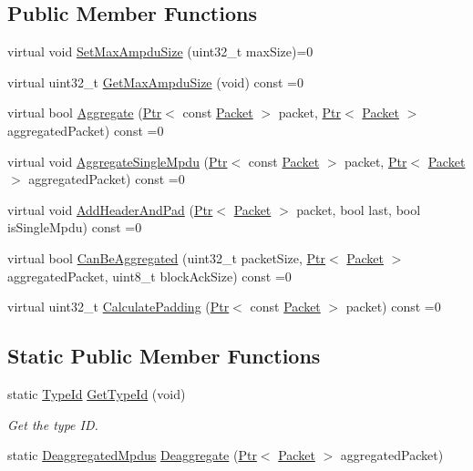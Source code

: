 \subsection*{Public Member Functions}
\begin{DoxyCompactItemize}
\item 
virtual void \hyperlink{classns3_1_1MpduAggregator_a00344d9ef60b8ad4368769b31761f55d}{Set\+Max\+Ampdu\+Size} (uint32\+\_\+t max\+Size)=0
\item 
virtual uint32\+\_\+t \hyperlink{classns3_1_1MpduAggregator_a781ed153a388bbc8a5ac231cfd9218c8}{Get\+Max\+Ampdu\+Size} (void) const =0
\item 
virtual bool \hyperlink{classns3_1_1MpduAggregator_a8452ad0dca5d5a0fef52991c4f4cf610}{Aggregate} (\hyperlink{classns3_1_1Ptr}{Ptr}$<$ const \hyperlink{classns3_1_1Packet}{Packet} $>$ packet, \hyperlink{classns3_1_1Ptr}{Ptr}$<$ \hyperlink{classns3_1_1Packet}{Packet} $>$ aggregated\+Packet) const =0
\item 
virtual void \hyperlink{classns3_1_1MpduAggregator_a41a0e95112386fd7b7e33c1c12dc6bb0}{Aggregate\+Single\+Mpdu} (\hyperlink{classns3_1_1Ptr}{Ptr}$<$ const \hyperlink{classns3_1_1Packet}{Packet} $>$ packet, \hyperlink{classns3_1_1Ptr}{Ptr}$<$ \hyperlink{classns3_1_1Packet}{Packet} $>$ aggregated\+Packet) const =0
\item 
virtual void \hyperlink{classns3_1_1MpduAggregator_afdac5a63ad17349e7454d5947938f923}{Add\+Header\+And\+Pad} (\hyperlink{classns3_1_1Ptr}{Ptr}$<$ \hyperlink{classns3_1_1Packet}{Packet} $>$ packet, bool last, bool is\+Single\+Mpdu) const =0
\item 
virtual bool \hyperlink{classns3_1_1MpduAggregator_a3b9a3eb957da16bb9e01e619b23df10a}{Can\+Be\+Aggregated} (uint32\+\_\+t packet\+Size, \hyperlink{classns3_1_1Ptr}{Ptr}$<$ \hyperlink{classns3_1_1Packet}{Packet} $>$ aggregated\+Packet, uint8\+\_\+t block\+Ack\+Size) const =0
\item 
virtual uint32\+\_\+t \hyperlink{classns3_1_1MpduAggregator_aef376d087d3039318f6ae8fa01181879}{Calculate\+Padding} (\hyperlink{classns3_1_1Ptr}{Ptr}$<$ const \hyperlink{classns3_1_1Packet}{Packet} $>$ packet) const =0
\end{DoxyCompactItemize}
\subsection*{Static Public Member Functions}
\begin{DoxyCompactItemize}
\item 
static \hyperlink{classns3_1_1TypeId}{Type\+Id} \hyperlink{classns3_1_1MpduAggregator_a5b9097a5ff858ae68a735446c2b3544e}{Get\+Type\+Id} (void)
\begin{DoxyCompactList}\small\item\em Get the type ID. \end{DoxyCompactList}\item 
static \hyperlink{classns3_1_1MpduAggregator_a09f3b03cb988045c381fad4ba4dce371}{Deaggregated\+Mpdus} \hyperlink{classns3_1_1MpduAggregator_a4c5daf1c185ea5e4b82ea028327ba202}{Deaggregate} (\hyperlink{classns3_1_1Ptr}{Ptr}$<$ \hyperlink{classns3_1_1Packet}{Packet} $>$ aggregated\+Packet)
\end{DoxyCompactItemize}
